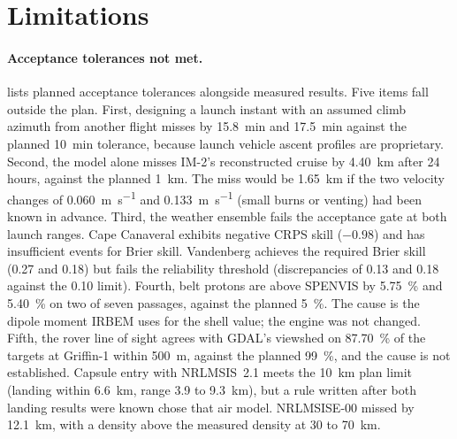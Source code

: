 \documentclass[11pt,a4paper]{article}
\begin{document}
\section{Limitations}
\label{sec:limits}

\paragraph{Acceptance tolerances not met.}  lists planned acceptance
tolerances alongside measured results. Five items fall outside the plan. First, designing a
launch instant with an assumed climb azimuth from another flight misses by \qty{15.8}{\minute}
and \qty{17.5}{\minute} against the planned \qty{10}{\minute} tolerance, because launch vehicle
ascent profiles are proprietary. Second, the model alone misses IM-2's reconstructed cruise by
\qty{4.40}{\km} after 24 hours, against the planned \qty{1}{\km}. The miss would be \qty{1.65}{\km}
if the two velocity changes of \qty{0.060}{\m\per\s} and \qty{0.133}{\m\per\s} (small burns or
venting) had been known in advance. Third, the weather ensemble fails the acceptance gate at
both launch ranges. Cape Canaveral exhibits negative CRPS skill ($-0.98$) and has insufficient
events for Brier skill. Vandenberg achieves the required Brier skill (0.27 and 0.18) but fails
the reliability threshold (discrepancies of 0.13 and 0.18 against the 0.10 limit).
Fourth, belt protons are above SPENVIS by \qty{5.75}{\percent} and \qty{5.40}{\percent} on two of
seven passages, against the planned \qty{5}{\percent}. The cause is the dipole moment IRBEM uses
for the shell value; the engine was not changed. Fifth, the rover line of sight agrees with
GDAL's viewshed on \qty{87.70}{\percent} of the targets at Griffin-1 within \qty{500}{\m},
against the planned \qty{99}{\percent}, and the cause is not established.
Capsule entry with NRLMSIS~2.1 meets the \qty{10}{\km} plan limit (landing within \qty{6.6}{\km},
range 3.9 to \qty{9.3}{\km}), but a rule written after both landing results were known chose that
air model. NRLMSISE-00 missed by \qty{12.1}{\km}, with a density above the measured density at
30 to \qty{70}{\km}.
\end{document}
